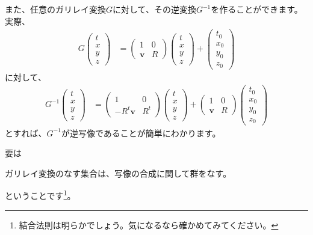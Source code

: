 また、任意のガリレイ変換$G$に対して、その逆変換$G^{-1}$を作ることができます。
実際、
\begin{align*}
  G
  \begin{pmatrix}
    t\\x\\y\\z
  \end{pmatrix}&=
  \begin{pmatrix}
    1 & 0 \\
    \mathbf{v} & R
  \end{pmatrix}
  \begin{pmatrix}
    t\\x\\y\\z
  \end{pmatrix}
  +
  \begin{pmatrix}
    t_0\\x_0\\y_0\\z_0
  \end{pmatrix}
\end{align*}
に対して、
\begin{align*}
  G^{-1}
  \begin{pmatrix}
    t\\x\\y\\z
  \end{pmatrix}&=
  \begin{pmatrix}
    1 & 0 \\
    -R^t\mathbf{v} & R^t
  \end{pmatrix}
  \begin{pmatrix}
    t\\x\\y\\z
  \end{pmatrix}
  +
  \begin{pmatrix}
    1 & 0 \\
    \mathbf{v} & R
  \end{pmatrix}
  \begin{pmatrix}
    t_0\\x_0\\y_0\\z_0
  \end{pmatrix}
\end{align*}
とすれば、$G^{-1}$が逆写像であることが簡単にわかります。

要は
\begin{theorem}
  ガリレイ変換のなす集合は、写像の合成に関して群をなす。
\end{theorem}
ということです\footnote{
  結合法則は明らかでしょう。気になるなら確かめてみてください。
}。
